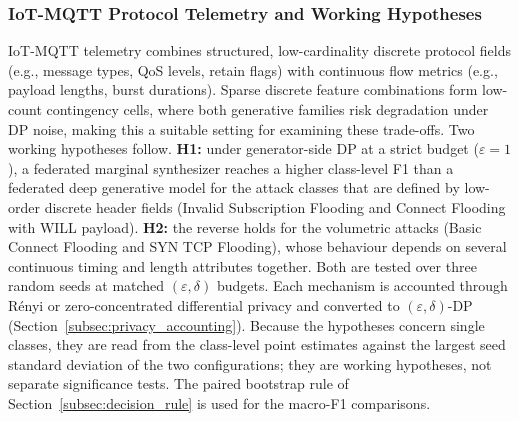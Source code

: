 \subsubsection*{IoT-MQTT Protocol Telemetry and Working Hypotheses}\label{par:hypotheses}
IoT-MQTT telemetry combines structured, low-cardinality discrete protocol fields (e.g., message types, QoS levels, retain flags) with continuous flow metrics (e.g., payload lengths, burst durations). Sparse discrete feature combinations form low-count contingency cells, where both generative families risk degradation under DP noise, making this a suitable setting for examining these trade-offs. Two working hypotheses follow. \textbf{H1:} under generator-side DP at a strict budget ($\varepsilon = 1$), a federated marginal synthesizer reaches a higher class-level F1 than a federated deep generative model for the attack classes that are defined by low-order discrete header fields (Invalid Subscription Flooding and Connect Flooding with WILL payload). \textbf{H2:} the reverse holds for the volumetric attacks (Basic Connect Flooding and SYN TCP Flooding), whose behaviour depends on several continuous timing and length attributes together. Both are tested over three random seeds at matched $(\varepsilon, \delta)$ budgets. Each mechanism is accounted through Rényi or zero-concentrated differential privacy and converted to $(\varepsilon, \delta)$-DP (Section~\ref{subsec:privacy_accounting}). Because the hypotheses concern single classes, they are read from the class-level point estimates against the largest seed standard deviation of the two configurations; they are working hypotheses, not separate significance tests. The paired bootstrap rule of Section~\ref{subsec:decision_rule} is used for the macro-F1 comparisons.


